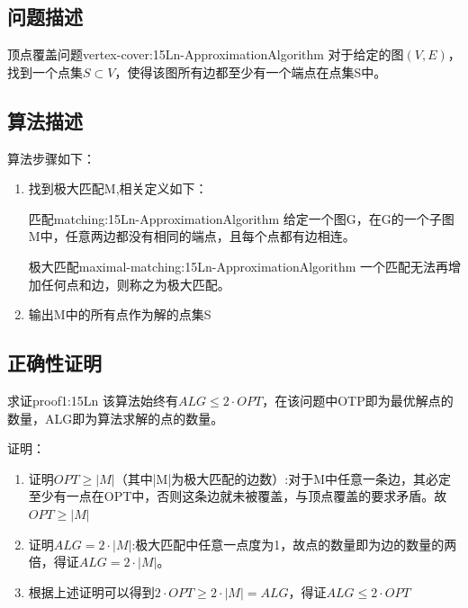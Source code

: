\subsection{问题描述}

\begin{definition}{顶点覆盖问题}{vertex-cover:15Ln-ApproximationAlgorithm}
	对于给定的图$(V,E)$，找到一个点集$S\subset V$，使得该图所有边都至少有一个端点在点集S中。
\end{definition}

\subsection{算法描述}

算法步骤如下：
\begin{enumerate}
	\item 找到极大匹配M,相关定义如下：
	\begin{definition}{匹配}{matching:15Ln-ApproximationAlgorithm}
		给定一个图G，在G的一个子图M中，任意两边都没有相同的端点，且每个点都有边相连。
	\end{definition}
	\begin{definition}{极大匹配}{maximal-matching:15Ln-ApproximationAlgorithm}
		一个匹配无法再增加任何点和边，则称之为极大匹配。
	\end{definition}
	\item 输出M中的所有点作为解的点集S
\end{enumerate}

\subsection{正确性证明}

\begin{proposition}{求证}{proof1:15Ln}
该算法始终有$ALG\leqslant 2\cdot OPT$，在该问题中OTP即为最优解点的数量，ALG即为算法求解的点的数量。
\end{proposition}
证明：
\begin{enumerate}
	\item 证明$OPT\geqslant |M|$（其中|M|为极大匹配的边数）:对于M中任意一条边，其必定至少有一点在OPT中，否则这条边就未被覆盖，与顶点覆盖的要求矛盾。故$OPT\geqslant |M|$
	\item 证明$ALG=2\cdot |M|$:极大匹配中任意一点度为1，故点的数量即为边的数量的两倍，得证$ALG=2\cdot |M|$。
	\item 根据上述证明可以得到$2\cdot OPT\geqslant 2\cdot|M|=ALG$，得证$ALG\leqslant 2\cdot OPT$
\end{enumerate}
	
